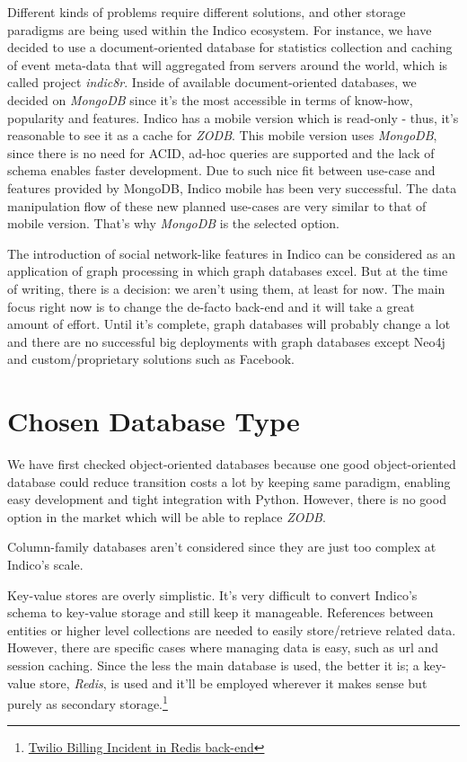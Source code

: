 Different kinds of problems require different solutions, and other storage paradigms are being used within the Indico ecosystem. For instance, we have decided to use a document-oriented database for statistics collection and caching of event meta-data that will aggregated from servers around the world, which is called project \textit{indic8r}. Inside of available document-oriented databases, we decided on \textit{MongoDB} since it's the most accessible in terms of know-how, popularity and features. Indico has a mobile version which is read-only - thus, it's reasonable to see it as a cache for \textit{ZODB}. This mobile version uses \textit{MongoDB}, since there is no need for ACID, ad-hoc queries are supported and the lack of schema enables faster development. Due to such nice fit between use-case and features provided by MongoDB, Indico mobile has been very successful. The data manipulation flow of these new planned use-cases are very similar to that of mobile version. That's why \textit{MongoDB} is the selected option.

The introduction of social network-like features in Indico can be considered as an application of graph processing in which graph databases excel. But at the time of writing, there is a decision: we aren't using them, at least for now. The main focus right now is to change the de-facto back-end and it will take a great amount of effort. Until it's complete, graph databases will probably change a lot and there are no successful big deployments with graph databases except Neo4j and custom/proprietary solutions such as Facebook.

\section{Chosen Database Type}

We have first checked object-oriented databases because one good object-oriented database could reduce transition costs a lot by keeping same paradigm, enabling easy development and tight integration with Python. However, there is no good option in the market which will be able to replace \textit{ZODB}.

Column-family databases aren't considered since they are just too complex at Indico's scale.

Key-value stores are overly simplistic. It's very difficult to convert Indico's schema to key-value storage and still keep it manageable. References between entities or higher level collections are needed to easily store/retrieve related data. However, there are specific cases where managing data is easy, such as url and session caching. Since the less the main database is used, the better it is; a key-value store, \textit{Redis}, is used and it'll be employed wherever it makes sense but purely as secondary storage.\footnote{\href{https://www.twilio.com/blog/2013/07/billing-incident-post-mortem-breakdown-analysis-and-root-cause.html}{Twilio Billing Incident in Redis back-end}}

